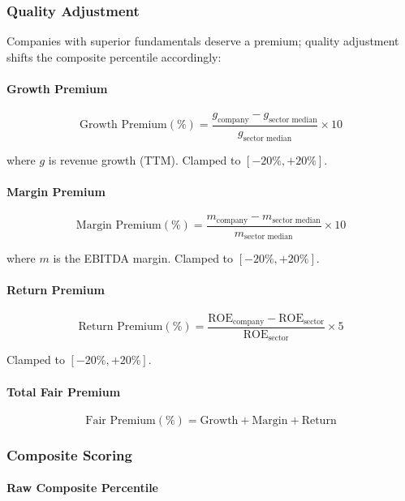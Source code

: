 \subsubsection{Quality Adjustment}

Companies with superior fundamentals deserve a premium; quality adjustment shifts the composite percentile accordingly:

\paragraph{Growth Premium}

\[
\text{Growth Premium}(\%) = \frac{g_{\text{company}} - g_{\text{sector median}}}{g_{\text{sector median}}} \times 10
\]

where $g$ is revenue growth (TTM). Clamped to $[-20\%, +20\%]$.

\paragraph{Margin Premium}

\[
\text{Margin Premium}(\%) = \frac{m_{\text{company}} - m_{\text{sector median}}}{m_{\text{sector median}}} \times 10
\]

where $m$ is the EBITDA margin. Clamped to $[-20\%, +20\%]$.

\paragraph{Return Premium}

\[
\text{Return Premium}(\%) = \frac{\text{ROE}_{\text{company}} - \text{ROE}_{\text{sector}}}{\text{ROE}_{\text{sector}}} \times 5
\]

Clamped to $[-20\%, +20\%]$.

\paragraph{Total Fair Premium}

\[
\text{Fair Premium}(\%) = \text{Growth} + \text{Margin} + \text{Return}
\]

\subsubsection{Composite Scoring}

\paragraph{Raw Composite Percentile}

